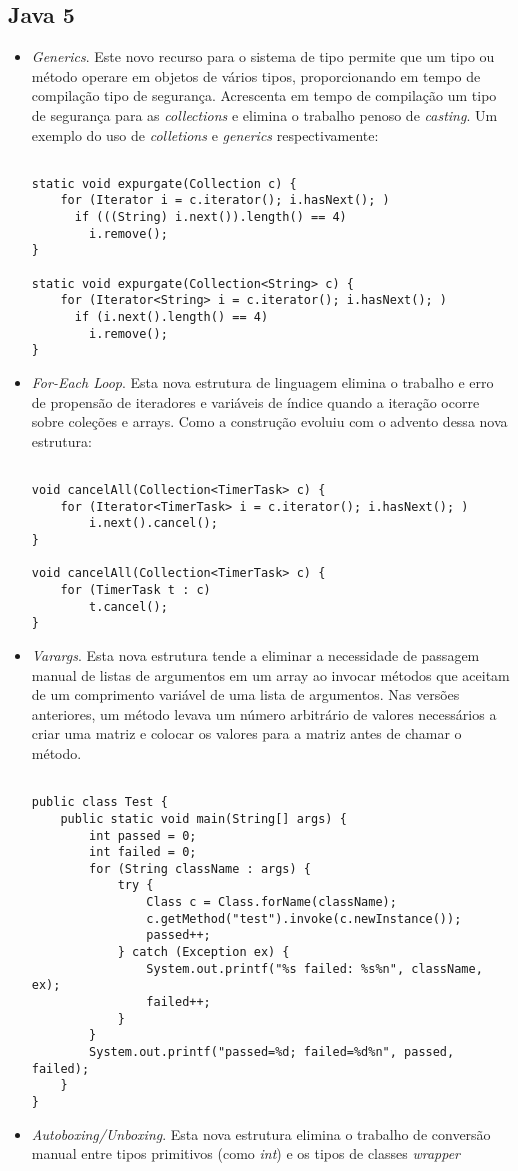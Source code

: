 \subsection {Java 5}
  \begin{itemize}
  \item {\it Generics}. Este novo recurso para o sistema de tipo permite que um tipo ou método operare em objetos de vários tipos, proporcionando em tempo de compilação tipo de segurança. Acrescenta em tempo de compilação um tipo de segurança para as {\it collections} e elimina o trabalho penoso de {\it casting}. Um exemplo do uso de {\it colletions} e {\it generics} respectivamente:
  \begin{verbatim}

static void expurgate(Collection c) {
    for (Iterator i = c.iterator(); i.hasNext(); )
      if (((String) i.next()).length() == 4)
        i.remove();
}

static void expurgate(Collection<String> c) {
    for (Iterator<String> i = c.iterator(); i.hasNext(); )
      if (i.next().length() == 4)
        i.remove();
}
  \end{verbatim}
  \item {\it For-Each Loop}. Esta nova estrutura de linguagem elimina o trabalho e erro de propensão de iteradores e variáveis de índice quando a iteração ocorre sobre coleções e arrays. Como a construção evoluiu com o advento dessa nova estrutura:
  \begin{verbatim}

void cancelAll(Collection<TimerTask> c) {
    for (Iterator<TimerTask> i = c.iterator(); i.hasNext(); )
        i.next().cancel();
}

void cancelAll(Collection<TimerTask> c) {
    for (TimerTask t : c)
        t.cancel();
}

  \end{verbatim}
  \item {\it Varargs}. Esta nova estrutura tende a eliminar a necessidade de passagem manual de listas de argumentos em um array ao invocar métodos que aceitam de um comprimento variável de uma lista de argumentos. Nas versões anteriores, um método levava um número arbitrário de valores necessários a  criar uma matriz e colocar os valores para a matriz antes de chamar o método.
  \begin{verbatim}

public class Test {
    public static void main(String[] args) {
        int passed = 0;
        int failed = 0;
        for (String className : args) {
            try {
                Class c = Class.forName(className);
                c.getMethod("test").invoke(c.newInstance());
                passed++;
            } catch (Exception ex) {
                System.out.printf("%s failed: %s%n", className, ex);
                failed++;
            }
        }
        System.out.printf("passed=%d; failed=%d%n", passed, failed);
    }
}
  \end{verbatim}
  \item {\it Autoboxing/Unboxing}. Esta nova estrutura elimina o trabalho de conversão manual entre tipos primitivos (como {\it int}) e os tipos de classes {\it wrapper}
  \end{itemize}

